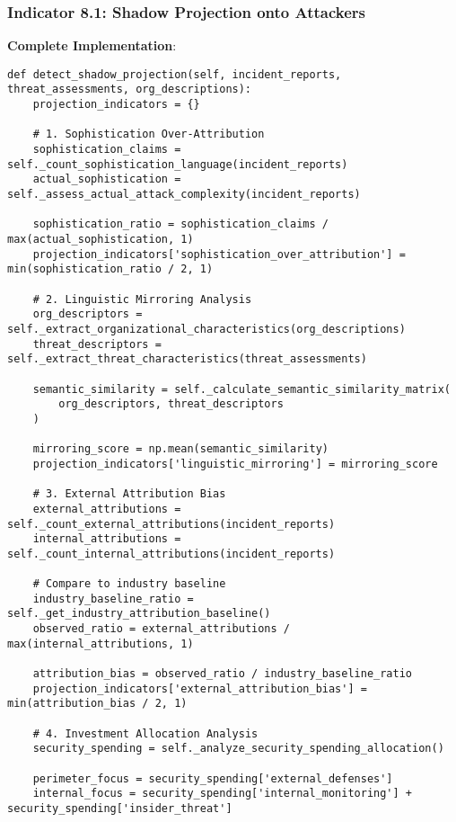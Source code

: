 \documentclass[11pt, onecolumn]{article}
\begin{document}
\subsubsection{Indicator 8.1: Shadow Projection onto Attackers}

\textbf{Complete Implementation}:

\begin{lstlisting}
def detect_shadow_projection(self, incident_reports, threat_assessments, org_descriptions):
    projection_indicators = {}
    
    # 1. Sophistication Over-Attribution
    sophistication_claims = self._count_sophistication_language(incident_reports)
    actual_sophistication = self._assess_actual_attack_complexity(incident_reports)
    
    sophistication_ratio = sophistication_claims / max(actual_sophistication, 1)
    projection_indicators['sophistication_over_attribution'] = min(sophistication_ratio / 2, 1)
    
    # 2. Linguistic Mirroring Analysis
    org_descriptors = self._extract_organizational_characteristics(org_descriptions)
    threat_descriptors = self._extract_threat_characteristics(threat_assessments)
    
    semantic_similarity = self._calculate_semantic_similarity_matrix(
        org_descriptors, threat_descriptors
    )
    
    mirroring_score = np.mean(semantic_similarity)
    projection_indicators['linguistic_mirroring'] = mirroring_score
    
    # 3. External Attribution Bias
    external_attributions = self._count_external_attributions(incident_reports)
    internal_attributions = self._count_internal_attributions(incident_reports)
    
    # Compare to industry baseline
    industry_baseline_ratio = self._get_industry_attribution_baseline()
    observed_ratio = external_attributions / max(internal_attributions, 1)
    
    attribution_bias = observed_ratio / industry_baseline_ratio
    projection_indicators['external_attribution_bias'] = min(attribution_bias / 2, 1)
    
    # 4. Investment Allocation Analysis
    security_spending = self._analyze_security_spending_allocation()
    
    perimeter_focus = security_spending['external_defenses']
    internal_focus = security_spending['internal_monitoring'] + security_spending['insider_threat']
    

\end{lstlisting}
\end{document}
